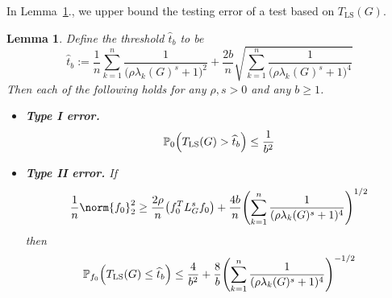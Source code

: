 \documentclass{article}
\newcommand{\1}{\mathbf{1}}
\newcommand{\Lap}{L}
\newcommand{\Pbb}{\mathbb{P}}
\newcommand{\wh}[1]{\widehat{#1}}
\newcommand{\LS}{\mathrm{LS}}
\theoremstyle{alden}
\theoremstyle{aldenthm}
\newtheorem{lemma}{Lemma}
\theoremstyle{definition}
\theoremstyle{remark}
\begin{document}
In Lemma~\ref{lem:ls_fixed_graph_testing}., we upper bound the testing error of a test based on $T_{\LS}(G)$.
\begin{lemma}
	\label{lem:ls_fixed_graph_testing}
	Define the threshold $\wh{t}_b$ to be
	\begin{equation*}
	\wh{t}_b := \frac{1}{n}\sum_{k = 1}^{n} \frac{1}{\bigl(\rho \lambda_k(G)^s + 1\bigr)^2} + \frac{2b}{n}\sqrt{\sum_{k = 1}^{n} \frac{1}{\bigl(\rho \lambda_k(G)^s + 1\bigr)^4}}
	\end{equation*}
	Then each of the following holds for any $\rho,s > 0$ and any $b \geq 1$.
	\begin{itemize}
		\item \textbf{Type I error.}
		\begin{equation}
		\label{eqn:ls_fixed_graph_testing_typeI}
		\Pbb_0\Bigl(T_{\LS}(G) > \wh{t}_b\Bigr) \leq \frac{1}{b^2}
		\end{equation}
		\item \textbf{Type II error.} If
		\begin{equation}
		\label{eqn:ls_fixed_graph_testing_critical_radius}
		\frac{1}{n}\norm{f_0}_2^2 \geq \frac{2 \rho}{n} \bigl(f_0^T \Lap_G^s f_0\bigr) + \frac{4b}{n} \Biggl(\sum_{k = 1}^{n} \frac{1}{(\rho\lambda_k(G)^s + 1)^4} \Biggr)^{1/2}
		\end{equation}
		then
		\begin{equation}
		\label{eqn:ls_fixed_graph_testing_typeII}
		\Pbb_{f_0}\Bigl(T_{\LS}(G) \leq \wh{t}_b\Bigr) \leq \frac{4}{b^2} + \frac{8}{b} \Biggl(\sum_{k = 1}^{n} \frac{1}{(\rho\lambda_k(G)^s + 1)^4} \Biggr)^{-1/2}
		\end{equation}
	\end{itemize}
\end{lemma}
\end{document}
